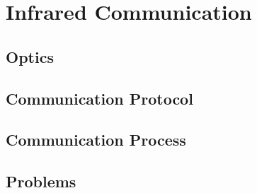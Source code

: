

\chapter{Infrared Communication}



\section{Optics}



\section{Communication Protocol}



\section{Communication Process}



\section{Problems}

